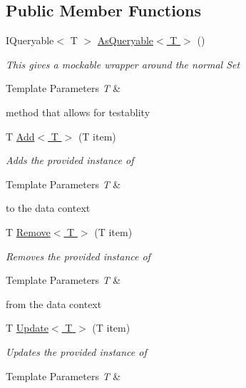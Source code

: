 \subsection*{Public Member Functions}
\begin{DoxyCompactItemize}
\item 
I\-Queryable$<$ T $>$ \hyperlink{interface_highway_1_1_data_1_1_interfaces_1_1_i_data_context_a2361aaf5d4e2635081a51c2244c841e8}{As\-Queryable$<$ T $>$} ()
\begin{DoxyCompactList}\small\item\em This gives a mockable wrapper around the normal Set
\begin{DoxyTemplParams}{Template Parameters}
{\em T} & \\
\hline
\end{DoxyTemplParams}
method that allows for testablity \end{DoxyCompactList}\item 
T \hyperlink{interface_highway_1_1_data_1_1_interfaces_1_1_i_data_context_aa40a195c7208c198ab56f4ddf3e33d27}{Add$<$ T $>$} (T item)
\begin{DoxyCompactList}\small\item\em Adds the provided instance of 
\begin{DoxyTemplParams}{Template Parameters}
{\em T} & \\
\hline
\end{DoxyTemplParams}
to the data context \end{DoxyCompactList}\item 
T \hyperlink{interface_highway_1_1_data_1_1_interfaces_1_1_i_data_context_a07a2c7548509a6db53dd3da67ff5125d}{Remove$<$ T $>$} (T item)
\begin{DoxyCompactList}\small\item\em Removes the provided instance of 
\begin{DoxyTemplParams}{Template Parameters}
{\em T} & \\
\hline
\end{DoxyTemplParams}
from the data context \end{DoxyCompactList}\item 
T \hyperlink{interface_highway_1_1_data_1_1_interfaces_1_1_i_data_context_a54acc7026404f8426c0e1efe6accaf26}{Update$<$ T $>$} (T item)
\begin{DoxyCompactList}\small\item\em Updates the provided instance of 
\begin{DoxyTemplParams}{Template Parameters}
{\em T} & \\

\end{DoxyTemplParams}
\end{DoxyCompactList}
\end{DoxyCompactItemize}
